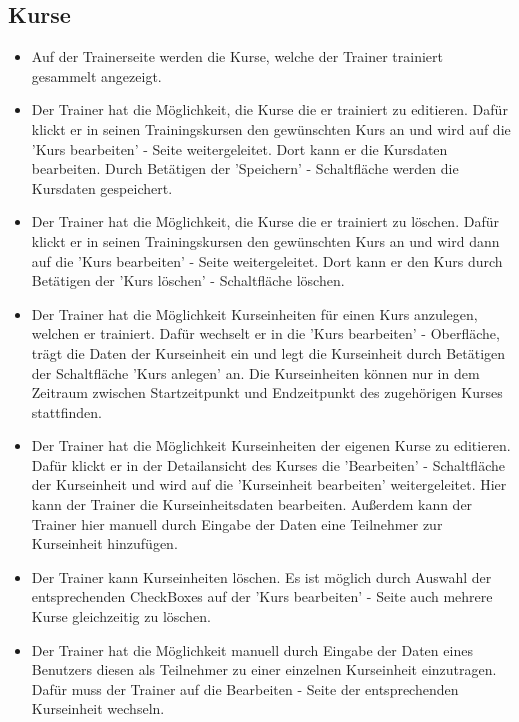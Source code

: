 \documentclass[a4paper]{scrreprt}
\begin{document}
\subsection{Kurse}
\begin{itemize}
	\item {}
	Auf der Trainerseite werden die Kurse, welche der Trainer trainiert gesammelt angezeigt.
	\item {}
	Der Trainer hat die Möglichkeit, die Kurse die er  trainiert zu editieren. Dafür klickt er in seinen Trainingskursen den gewünschten Kurs an und wird auf die 'Kurs bearbeiten' - Seite weitergeleitet. 
	Dort kann er die Kursdaten bearbeiten. Durch Betätigen der 'Speichern' - Schaltfläche werden die Kursdaten gespeichert.
	\item {}
	Der Trainer hat die Möglichkeit, die Kurse die er  trainiert zu löschen. Dafür klickt er in seinen Trainingskursen den gewünschten Kurs an und wird dann auf die 'Kurs bearbeiten' - Seite weitergeleitet. 
	Dort kann er den Kurs durch Betätigen der 'Kurs löschen' - Schaltfläche löschen.
	\item {}
	Der Trainer hat die Möglichkeit Kurseinheiten für einen Kurs anzulegen, welchen er trainiert. Dafür wechselt er in die 'Kurs bearbeiten' - Oberfläche, trägt die Daten der Kurseinheit ein und legt die Kurseinheit durch Betätigen der Schaltfläche 'Kurs anlegen' an. Die Kurseinheiten können nur in dem Zeitraum zwischen Startzeitpunkt und Endzeitpunkt des zugehörigen Kurses stattfinden.
	\item {}
	Der Trainer hat die Möglichkeit Kurseinheiten der eigenen Kurse zu editieren. Dafür klickt er in der Detailansicht des Kurses die 'Bearbeiten' - Schaltfläche der Kurseinheit und wird auf die 'Kurseinheit bearbeiten' weitergeleitet. Hier kann der Trainer die Kurseinheitsdaten bearbeiten. Außerdem kann der Trainer hier
	manuell durch Eingabe der Daten eine Teilnehmer zur Kurseinheit hinzufügen.
	\item {}
	Der Trainer kann Kurseinheiten löschen. Es ist möglich durch Auswahl der entsprechenden CheckBoxes auf der 'Kurs bearbeiten' - Seite auch mehrere Kurse gleichzeitig zu löschen.
	\item {}
	Der Trainer hat die Möglichkeit manuell durch Eingabe der Daten eines Benutzers diesen als Teilnehmer zu einer einzelnen Kurseinheit einzutragen. Dafür muss der Trainer auf die Bearbeiten - Seite der entsprechenden Kurseinheit wechseln.

\end{itemize}
\end{document}
